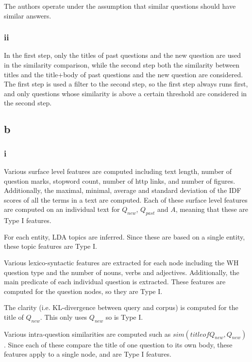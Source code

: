 \documentclass[paper=a4, fontsize=11pt]{scrartcl}
\begin{document}
The authors operate under the assumption that similar questions should have
similar answers.

\subsubsection*{ii}

In the first step, only the titles of past questions and the new question are
used in the similarity comparison, while the second step both the similarity
between titles and the title+body of past questions and the new question are
considered.
The first step is used a filter to the second step, so the first step always
runs first, and only questions whose similarity is above a certain threshold
are considered in the second step.

\subsection*{b}

\subsubsection*{i}

Various surface level features are computed including text length, number of
question marks, stopword count, number of http links, and number of figures.
Additionally, the maximal, minimal, average and standard deviation of the IDF
scores of all the terms in a text are computed. Each of these surface level
features are computed on an individual text for $Q_{new}$, $Q_{past}$ and $A$,
meaning that these are Type I features.

For each entity, LDA topics are inferred. Since these are based on a single
entity, these topic features are Type I.

Various lexico-syntactic features are extracted for each node including the WH
question type and the number of nouns, verbs and adjectives. Additionally, the
main predicate of each individual question is extracted. These features
are computed for the question nodes, so they are Type I.

The clarity (i.e. KL-divergence between query and corpus) is computed for the
title of $Q_{new}$. This only uses $Q_{new}$ so is Type I.

Various intra-question similarities are computed such as $sim(title of
Q_{new}, Q_{new})$. Since each of these compare the title of one question to
its own body, these features apply to a single node, and are Type I features.
\end{document}
